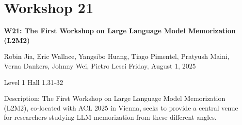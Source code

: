 \clearpage


\section[W21: The First Workshop on Large Language Model Memorization (L2M2)]{Workshop 21}
\label{workshop_21}

\begin{center}
    {\Large \textbf{W21: The First Workshop on Large Language Model Memorization (L2M2)}}

Robin Jia, Eric Wallace, Yangsibo Huang, Tiago Pimentel, Pratyush Maini, Verna Dankers, Johnny Wei, Pietro Lesci
    Friday, August 1, 2025

    Level 1 Hall 1.31-32
    
\end{center}

Description: The First Workshop on Large Language Model Memorization (L2M2), co-located with ACL 2025 in Vienna, seeks to provide a central venue for researchers studying LLM memorization from these different angles.

